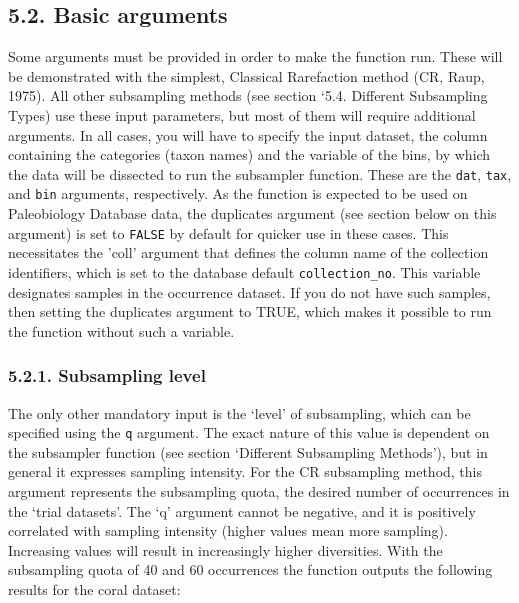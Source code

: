 \documentclass[]{article}
\begin{document}
\hypertarget{basic-arguments}{%
\subsection{5.2. Basic arguments}\label{basic-arguments}}

Some arguments must be provided in order to make the function run. These
will be demonstrated with the simplest, Classical Rarefaction method
(CR, Raup, 1975). All other subsampling methods (see section `5.4.
Different Subsampling Types) use these input parameters, but most of
them will require additional arguments. In all cases, you will have to
specify the input dataset, the column containing the categories (taxon
names) and the variable of the bins, by which the data will be dissected
to run the subsampler function. These are the \texttt{dat},
\texttt{tax}, and \texttt{bin} arguments, respectively. As the function
is expected to be used on Paleobiology Database data, the duplicates
argument (see section below on this argument) is set to \texttt{FALSE}
by default for quicker use in these cases. This necessitates the 'coll'
argument that defines the column name of the collection identifiers,
which is set to the database default \texttt{collection\_no}. This
variable designates samples in the occurrence dataset. If you do not
have such samples, then setting the duplicates argument to TRUE, which
makes it possible to run the function without such a variable.

\hypertarget{subsampling-level}{%
\subsubsection{5.2.1. Subsampling level}\label{subsampling-level}}

The only other mandatory input is the `level' of subsampling, which can
be specified using the \texttt{q} argument. The exact nature of this
value is dependent on the subsampler function (see section `Different
Subsampling Methods'), but in general it expresses sampling intensity.
For the CR subsampling method, this argument represents the subsampling
quota, the desired number of occurrences in the `trial datasets'. The
`q' argument cannot be negative, and it is positively correlated with
sampling intensity (higher values mean more sampling). Increasing values
will result in increasingly higher diversities. With the subsampling
quota of 40 and 60 occurrences the function outputs the following
results for the coral dataset:
\end{document}
